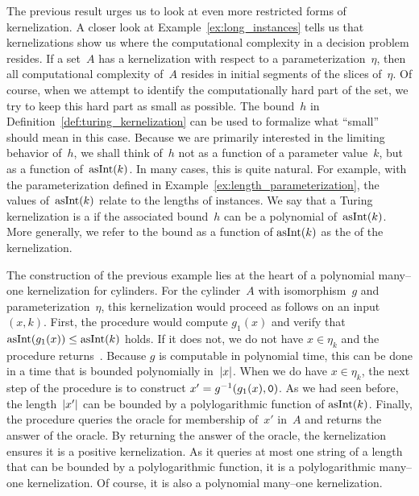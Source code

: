 The previous result urges us to look at even more restricted forms of kernelization.
A closer look at Example~\ref{ex:long_instances} tells us that kernelizations show us where the computational complexity in a decision problem resides.
If a set~$A$ has a kernelization with respect to a parameterization~$\eta$, then all computational complexity of~$A$ resides in initial segments of the slices of~$\eta$.
Of course, when we attempt to identify the computationally hard part of the set, we try to keep this hard part as small as possible.
The bound~$h$ in Definition~\ref{def:turing_kernelization} can be used to formalize what \enquote{small} should mean in this case.
Because we are primarily interested in the limiting behavior of~$h$, we shall think of~$h$ not as a function of a parameter value~$k$, but as a function of~$\operatorname{asInt}(k)$.
In many cases, this is quite natural.
For example, with the parameterization defined in Example~\ref{ex:length_parameterization}, the values of~$\operatorname{asInt}(k)$ relate to the lengths of instances.
We say that a Turing kernelization is a  if the associated bound~$h$ can be a polynomial of~$\operatorname{asInt}(k)$.
More generally, we refer to the bound as a function of $\operatorname{asInt}(k)$ as the  of the kernelization.
\begin{example}
  The construction of the previous example lies at the heart of a polynomial many--one kernelization for \pdash{}cylinders.
  For the \pdash{}cylinder~$A$ with isomorphism~$g$ and parameterization~$\eta$, this kernelization would proceed as follows on an input~$(x, k)$.
  First, the procedure would compute $g_1(x)$ and verify that $\operatorname{asInt}(g_1(x)) \le \operatorname{asInt}(k)$ holds.
  If it does not, we do not have $x \in \eta_k$ and the procedure returns~.
  Because $g$ is computable in polynomial time, this can be done in a time that is bounded polynomially in~${\lvert x\rvert}$.
  When we do have $x \in \eta_k$, the next step of the procedure is to construct $x' = g^{-1}(g_1(x), \textnormal{\texttt{0}})$.
  As we had seen before, the length~${\lvert x'\rvert}$ can be bounded by a polylogarithmic function of $\operatorname{asInt}(k)$.
  Finally, the procedure queries the oracle for membership of~$x'$ in~$A$ and returns the answer of the oracle.
  By returning the answer of the oracle, the kernelization ensures it is a positive kernelization.
  As it queries at most one string of a length that can be bounded by a polylogarithmic function, it is a polylogarithmic many--one kernelization.
  Of course, it is also a polynomial many--one kernelization.
\end{example}

